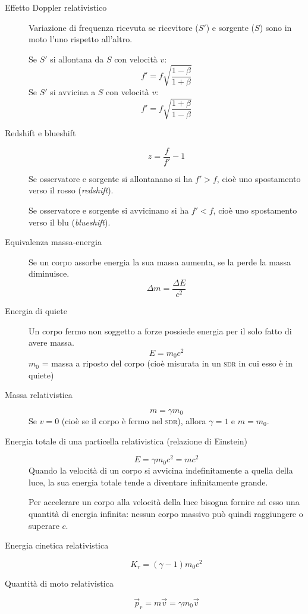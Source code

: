 \documentclass[a4paper,11pt,italian]{article}
\begin{document}
\begin{description}
  \item[Effetto Doppler relativistico]
  Variazione di frequenza ricevuta se ricevitore ($ S' $) e sorgente ($ S $) sono in moto l'uno rispetto all'altro.
  \begin{multicols}{2}
  Se $ S' $ si allontana da $ S $ con velocità $ v $:
  \[ f' = f \sqrt{\frac{1 - \beta}{1 + \beta}} \]
  Se $ S' $ si avvicina a $ S $ con velocità $ v $:
  \[ f' = f \sqrt{\frac{1 + \beta}{1 - \beta}} \]
  \end{multicols}
  
  \item[Redshift e blueshift]
  \[ z = \frac{f}{f'} - 1 \]
  
  Se osservatore e sorgente si allontanano si ha $ f'>f $, cioè uno spostamento verso il rosso (\emph{redshift}).
  
  Se osservatore e sorgente si avvicinano si ha $ f'<f $, cioè uno spostamento verso il blu (\emph{blueshift}).
  
  \item[Equivalenza massa-energia] Se un corpo assorbe energia la sua massa aumenta, se la perde la massa diminuisce.
  \[ \Delta m = \frac{\Delta E}{c^2} \]
  
  \item[Energia di quiete] Un corpo fermo non soggetto a forze possiede energia per il solo fatto di avere massa.
  \[ E = m_0 c^2 \]
  $ m_0 $ = massa a riposto del corpo (cioè misurata in un \textsc{sdr} in cui esso è in quiete)
  
  \item[Massa relativistica]
  \[ m = \gamma m_0 \]
  Se $ v = 0 $ (cioè se il corpo è fermo nel \textsc{sdr}), allora $ \gamma = 1 $ e $ m=m_0 $.
  
  \item[Energia totale di una particella relativistica (relazione di Einstein)]
  \[ E = \gamma m_0 c^2 = mc^2\]
  Quando la velocità di un corpo si avvicina indefinitamente a quella della luce, la sua energia totale tende a diventare infinitamente grande.
  
  Per accelerare un corpo alla velocità della luce bisogna fornire ad esso una quantità di energia infinita: nessun corpo massivo può quindi raggiungere o superare $ c $.
  
  \item[Energia cinetica relativistica] 
  \[ K_r = (\gamma -1) m_0 c^2 \]

  \item[Quantità di moto relativistica] 
  \[ \vec{p}_r = m \vec{v} = \gamma m_0 \vec{v} \]


\end{description}
\end{document}
